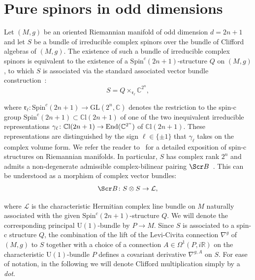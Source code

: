 \documentclass[10pt,a4paper,twoside,reqno]{amsart}
\theoremstyle{plain}
\theoremstyle{definition}
\theoremstyle{remark}
\def\C{\mathbb{C}}
\def\R{\mathbb{R}}
\def\scB{\Scr B}
\def\U{\mathrm{U}}
\def\R{\mathbb{R}}
\begin{document}

\section{Pure spinors in odd dimensions}
\label{sec:purespinors}


Let $(M,g)$ be an oriented Riemannian manifold of odd dimension $d = 2n + 1$ and let $S$ be a bundle of irreducible complex spinors over the bundle of Clifford algebras of $(M,g)$. The existence of such a bundle of irreducible complex spinors is equivalent to the existence of a $\mathrm{Spin}^c(2n+1)$-structure $Q$ on $(M,g)$, to which $S$ is associated via the standard associated vector bundle construction~\cite{LS18}:
\begin{equation*}
S = Q\times_{\mathfrak{r}_{\ell}} \mathbb{C}^{2^n},
\end{equation*}

\noindent
where $\mathfrak{r}_{\ell}\colon \mathrm{Spin}^c(2n+1) \to \mathrm{GL}(2^n,\C)$ denotes the restriction to the spin-c group $\mathrm{Spin}^c(2n+1) \subset \mathbb{C}\mathrm{l}(2n+1)$ of one of the two inequivalent irreducible representations $\gamma_{\ell}\colon\mathbb{C}\mathrm{l}(2n+1)\to\mathrm{End}(\smash{\mathbb{C}^{2^n}})$ of $\mathbb{C}\mathrm{l}(2n+1)$. These representations are distinguished by the sign $\ell\in\{\pm1\}$ that $\gamma_{\ell}$ takes on the complex volume form. We refer the reader to~\cite[Sec.~2.4]{Friedrich2000} for a detailed exposition of spin-c structures on Riemannian manifolds. In particular, $S$ has complex rank $2^n$ and admits a non-degenerate admissible complex-bilinear pairing $\scB$~\cite{AC97,ACDVP05}. This can be understood as a morphism of complex vector bundles:
\begin{equation*}
\scB \colon S\otimes S \to \mathcal{L},
\end{equation*}

\noindent
where $\mathcal{L}$ is the characteristic Hermitian complex line bundle on $M$ naturally associated with the given $\mathrm{Spin}^c(2n+1)$-structure $Q$. We will denote the corresponding principal $\U(1)$-bundle by $P\to M$. Since $S$ is associated to a spin-c structure $Q$, the combination of the lift of the Levi-Civita connection $\nabla^g$ of $(M,g)$ to $S$ together with a choice of a connection $A\in\Omega^1(P,i\R)$ on the characteristic $\U(1)$-bundle $P$ defines a covariant derivative $\nabla^{g,A}$ on $S$. For ease of notation, in the following we will denote Clifford multiplication simply by a \emph{dot}.
\end{document}
